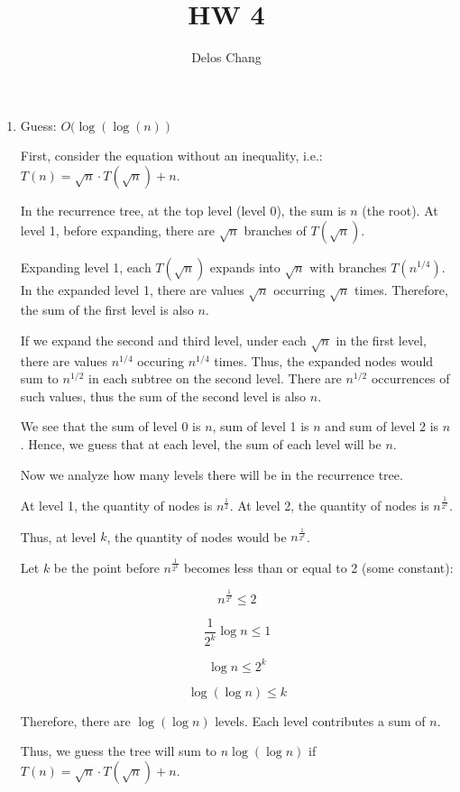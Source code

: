 \documentclass[a4paper]{report}
\title{HW 4}
\author{Delos Chang}
\date{}
\begin{document}
  \begin{enumerate}
    \item 

      Guess: $O(\log(\log(n))$

      First, consider the equation without an inequality, i.e.: $T(n) = \sqrt{n} \cdot T(\sqrt{n}) + n$.

      In the recurrence tree, at the top level (level 0), the sum is $n$ (the root). At level 1, before expanding, there are
      $\sqrt{n}$ branches of $T(\sqrt{n})$.

      Expanding level 1, each $T(\sqrt{n})$ expands into $\sqrt{n}$ with branches $T(n^{1/4})$. In the expanded
      level 1, there are values $\sqrt{n}$ occurring $\sqrt{n}$ times. Therefore, the sum of the first level is also $n$.

      If we expand the second and third level, under each $\sqrt{n}$ in the first level, there are values $n^{1/4}$ occuring $n^{1/4}$ times.
      Thus, the expanded nodes would sum to $n^{1/2}$ in each subtree on the second level. There are $n^{1/2}$ occurrences of such values,
      thus the sum of the second level is also $n$.

      We see that the sum of level 0 is $n$, sum of level 1 is $n$ and sum of level 2 is $n$. Hence, we guess that at each level, the sum of each level will be $n$. 

      Now we analyze how many levels there will be in the recurrence tree. 

      At level 1, the quantity of nodes is $n^{\frac{1}{2}}$.
      At level 2, the quantity of nodes is $n^{\frac{1}{2^{2}}}$.

      Thus, at level $k$, the quantity of nodes would be $n^{\frac{1}{2^k}}$.

      Let $k$ be the point before $n^{\frac{1}{2^k}}$ becomes less than or equal to 2 (some constant):

      $$n^{\frac{1}{2^k}} \leq 2 $$

      $$\frac{1}{2^k} \log n \leq 1 $$

      $$ \log n \leq 2^{k} $$

      $$ \log(\log n) \leq k $$

      Therefore, there are $\log(\log n)$ levels. Each level contributes a sum of $n$. 

      Thus, we guess the tree will sum to $n \log(\log n)$ if $T(n) = \sqrt{n} \cdot T(\sqrt{n}) + n$.


\end{enumerate}
\end{document}
